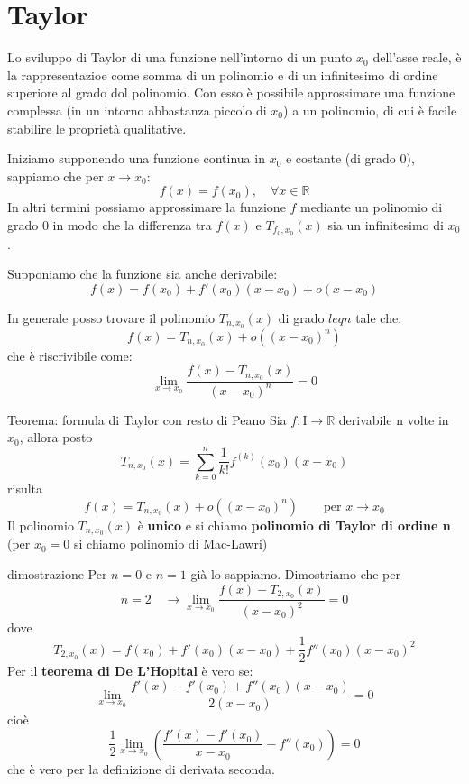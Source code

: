 \documentclass[x11names]{article}
\begin{document}
	\newpage
	\section{Taylor}
	Lo sviluppo di Taylor di una funzione nell'intorno di un punto $x_0$ dell'asse reale, è la rappresentazioe come somma di un polinomio e di un infinitesimo di ordine superiore al grado dol polinomio. Con esso è possibile approssimare una funzione complessa (in un intorno abbastanza piccolo di $x_0$) a un polinomio, di cui è facile stabilire le proprietà qualitative.
	
	Iniziamo supponendo una funzione continua in $x_0$ e costante (di grado 0), sappiamo che per $x\to x_0$:
	\[
	f(x) = f(x_0), \quad \forall x \in \mathbb{R}
	\]
	In altri termini possiamo approssimare la funzione $f$ mediante un polinomio di grado 0 in modo che la differenza tra $f(x)$ e $T_{f_0,x_0}(x)$ sia un infinitesimo di $x_0$.
	
	Supponiamo che la funzione sia anche derivabile:
	\[
	f(x) = f(x_0) + f'(x_0)(x-x_0) + o(x-x_0)
	\]
	
	In generale posso trovare il polinomio $T_{n,x_0}(x)$ di grado $leq n$ tale che:
	\[
	f(x) = T_{n,x_0}(x) + o\left( (x-x_0)^n\right)
	\]
	che è riscrivibile come:
	\[
	\lim_{x\to x_0}\frac{f(x) - T_{n,x_0}(x)}{(x-x_0)^n} = 0
	\]
	\begin{center}
		\colorbox{myred}{\begin{minipage}{5.75in}
				\begin{redes}{Teorema: formula di Taylor con resto di Peano}
					Sia $f:$I$\to \mathbb{R}$ derivabile n volte in $x_0$, allora posto
					\[
					T_{n,x_0}(x) = \sum_{k=0}^{n}\frac{1}{k!}f^{(k)}(x_0)(x-x_0)
					\]
					risulta
					\[
					f(x) = T_{n,x_0}(x) + o\left( (x-x_0)^n\right) \qquad \text{per }x \to x_0
					\]
					Il polinomio $T_{n,x_0}(x)$ è \textbf{unico} e si chiamo \textbf{polinomio di Taylor di ordine n} (per $x_0 = 0$ si chiamo polinomio di Mac-Lawri)
				\end{redes} 
		\end{minipage}}        
	\end{center}
	\begin{es}{dimostrazione}
		Per $n=0$ e $n=1$ già lo sappiamo. Dimostriamo che per 
		\[
		n = 2 \quad \to \lim_{x\to x_0}\frac{f(x) - T_{2,x_0}(x)}{(x-x_0)^2} = 0
		\]
		dove
		\[
		T_{2,x_0}(x) = f(x_0) + f'(x_0)(x-x_0) + \frac{1}{2}f''(x_0)(x-x_0)^2
		\]
		Per il \textbf{teorema di De L'Hopital} è vero se:
		\[
		\lim_{x\to x_0}\frac{f'(x) - f'(x_0)+f''(x_0)(x-x_0)}{2(x-x_0)} = 0
		\]
		cioè
		\[
		\frac{1}{2}\lim_{x\to x_0}\left( \frac{f'(x) - f'(x_0)}{x-x_0} - f''(x_0)\right) = 0
		\]
		che è vero per la definizione di derivata seconda.
	\end{es}
	
\end{document}
